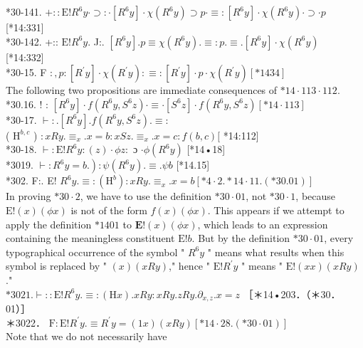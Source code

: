 \documentclass[10pt]{article}
\begin{document}
*30-141. $+:: \mathrm{E}!R^{6} y \cdot \supset: \cdot\left[R^{6} y\right] \cdot \chi\left(R^{6} y\right) \supset p \cdot \equiv:\left[R^{6} y\right] \cdot \chi\left(R^{6} y\right) \cdot \supset \cdot p$ [*14:331]\\
*30-142. +:: $\mathrm{E}!R^{6} y$. J:. $\left[R^{6} y\right] . p \equiv \chi\left(R^{6} y\right) . \equiv: p . \equiv .\left[R^{6} y\right] \cdot \chi\left(R^{6} y\right)$\\[0pt]
[*14:332]\\
*30-15. F $:, p:\left[R^{\prime} y\right] \cdot \chi\left(R^{\prime} y\right): \equiv:\left[R^{\prime} y\right] \cdot p \cdot \chi\left(R^{\prime} y\right)[* 1434]$\\
The following two propositions are immediate consequences of $* 14 \cdot 113 \cdot 112$.\\
*30.16. ! : $\left[R^{6} y\right] \cdot f\left(R^{6} y, S^{6} z\right) \cdot \equiv \cdot\left[S^{6} z\right] \cdot f\left(R^{6} y, S^{6} z\right)[* 14 \cdot 113]$\\
*30-17. $\vdash: .\left[R^{6} y\right] . f\left(R^{6} y, S^{6} z\right) . \equiv:$\\
( $\mathrm{H}^{b, c}$ ) $: x R y . \equiv_{x} . x=b: x S z . \equiv_{x} . x=c: f(b, c)[$ *14:112]\\
*30-18. $\vdash: \mathrm{E}!R^{6} y:(z) \cdot \phi z:$ ɔ $\cdot \phi\left(R^{6} y\right)$ [*14•18]\\
*3019. $\left.\vdash: R^{6} y=b.\right): \psi\left(R^{6} y\right) . \equiv . \psi b$ [*14.15]\\
*302. F:. E! $R^{6} y . \equiv:\left(\mathrm{H}^{b}\right): x R y . \equiv_{x} . x=b[* 4 \cdot 2 . * 14 \cdot 11 .(* 30.01)]$\\
In proving $* 30 \cdot 2$, we have to use the definition $* 30 \cdot 01$, not $* 30 \cdot 1$, because $\mathrm{E}!(x)(\phi x)$ is not of the form $f(x)(\phi x)$. This appears if we attempt to apply the definition $* 1401$ to $\mathbf{E}!(x)(\phi x)$, which leads to an expression containing the meaningless constituent $\mathrm{E}!b$. But by the definition $* 30 \cdot 01$, every typographical occurrence of the symbol " $R^{6} y$ " means what results when this symbol is replaced by " $(x)(x R y)$," hence " $\mathrm{E}!R^{\prime} y$ " means " $\mathrm{E}!(x x)(x R y)$."\\
$* 3021 . \vdash:: \mathrm{E}!R^{6} y . \equiv:(\mathrm{H} x) . x R y: x R y . z R y . \partial_{x, z} . x=z$ ［＊14•203．（＊30．01）］\\
＊3022． $\mathrm{F}: \mathrm{E}!R^{\prime} y . \equiv R^{\prime} y=(1 x)(x R y)[* 14 \cdot 28 .(* 30 \cdot 01)]$\\
Note that we do not necessarily have
\end{document}
